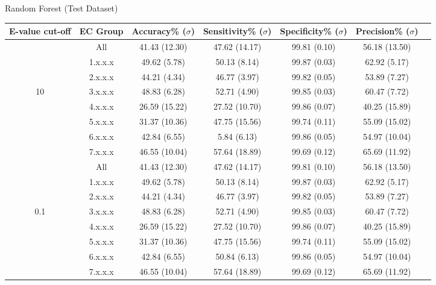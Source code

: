 \documentclass[12pt]{article}
\makeatletter
\renewcommand\subsubsection{\@startsection{subsubsection}{4}{\z@}
            {-2.5ex\@plus -1ex \@minus -.25ex}
            {1ex \@plus .25ex}
            {\normalfont\large\bfseries}}
\makeatother
\begin{document}
			\begin{landscape}
			
				\subsubsection{Random Forest (Test Dataset)}
				\label{appendix:results:class:forest}			
			
			\begin{tabular}{|c||c||c|c|c|c|c|}
			\hline
			E-value cut-off&EC Group
			&Accuracy\% ($\sigma$)&Sensitivity\% ($\sigma$)&Specificity\% ($\sigma$)&Precision\% ($\sigma$)\\
			\hline
			&All&41.43 (12.30)&47.62 (14.17)&99.81 (0.10)&56.18 (13.50)\\
			\cline{2-6}
			&1.x.x.x&49.62 (5.78)&50.13 (8.14)&99.87 (0.03)&62.92 (5.17)\\
			\cline{2-6}
			&2.x.x.x&44.21 (4.34)&46.77 (3.97)&99.82 (0.05)&53.89 (7.27)\\
			\cline{2-6}
			10&3.x.x.x&48.83 (6.28)&52.71 (4.90)&99.85 (0.03)&60.47 (7.72)\\
			\cline{2-6}
			&4.x.x.x&26.59 (15.22)&27.52 (10.70)&99.86 (0.07)&40.25 (15.89)\\
			\cline{2-6}
			&5.x.x.x&31.37 (10.36)&47.75 (15.56)&99.74 (0.11)&55.09 (15.02)\\
			\cline{2-6}
			&6.x.x.x&42.84 (6.55)&5.84 (6.13)&99.86 (0.05)&54.97 (10.04)\\
			\cline{2-6}
			&7.x.x.x&46.55 (10.04)&57.64 (18.89)&99.69 (0.12)&65.69 (11.92)\\
			\hline
			\hline
			&All&41.43 (12.30)&47.62 (14.17)&99.81 (0.10)&56.18 (13.50)\\
			\cline{2-6}
			&1.x.x.x&49.62 (5.78)&50.13 (8.14)&99.87 (0.03)&62.92 (5.17)\\
			\cline{2-6}
			&2.x.x.x&44.21 (4.34)&46.77 (3.97)&99.82 (0.05)&53.89 (7.27)\\
			\cline{2-6}
			0.1&3.x.x.x&48.83 (6.28)&52.71 (4.90)&99.85 (0.03)&60.47 (7.72)\\
			\cline{2-6}
			&4.x.x.x&26.59 (15.22)&27.52 (10.70)&99.86 (0.07)&40.25 (15.89)\\
			\cline{2-6}
			&5.x.x.x&31.37 (10.36)&47.75 (15.56)&99.74 (0.11)&55.09 (15.02)\\
			\cline{2-6}
			&6.x.x.x&42.84 (6.55)&50.84 (6.13)&99.86 (0.05)&54.97 (10.04)\\
			\cline{2-6}
			&7.x.x.x&46.55 (10.04)&57.64 (18.89)&99.69 (0.12)&65.69 (11.92)\\
			\hline
			
		\end{tabular}
		\end{landscape}
		
\end{document}
